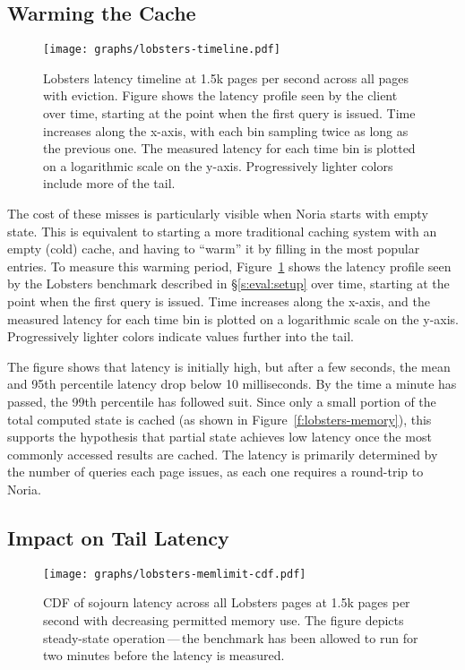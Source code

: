 \subsection{Warming the Cache}

\begin{figure}[t]
  \centering
  \texttt{[image: graphs/lobsters-timeline.pdf]}
  \caption{Lobsters latency timeline at 1.5k pages per second across all pages
  with eviction. Figure shows the latency profile seen by the client over time,
  starting at the point when the first query is issued. Time increases along the
  x-axis, with each bin sampling twice as long as the previous one. The measured
  latency for each time bin is plotted on a logarithmic scale on the y-axis.
  Progressively lighter colors include more of the tail.}
  \label{f:lobsters-timeline}
\end{figure}

The cost of these misses is particularly visible when Noria starts with empty
state. This is equivalent to starting a more traditional caching system with an
empty (cold) cache, and having to ``warm'' it by filling in the most popular
entries. To measure this warming period, Figure~\ref{f:lobsters-timeline} shows
the latency profile seen by the Lobsters benchmark described in
\S\ref{s:eval:setup} over time, starting at the point when the first query is
issued. Time increases along the x-axis, and the measured latency for each time
bin is plotted on a logarithmic scale on the y-axis. Progressively lighter
colors indicate values further into the tail.

The figure shows that latency is initially high, but after a few seconds, the
mean and 95th percentile latency drop below 10 milliseconds. By the time a
minute has passed, the 99th percentile has followed suit. Since only a small
portion of the total computed state is cached (as shown in
Figure~\ref{f:lobsters-memory}), this supports the hypothesis that partial state
achieves low latency once the most commonly accessed results are cached.
The latency is primarily determined by the number of queries each page issues,
as each one requires a round-trip to Noria.

\subsection{Impact on Tail Latency}

\begin{figure}[h]
  \centering
  \texttt{[image: graphs/lobsters-memlimit-cdf.pdf]}
  \caption{CDF of sojourn latency across all Lobsters pages at 1.5k pages per
  second with decreasing permitted memory use. The figure depicts steady-state
  operation\,---\,the benchmark has been allowed to run for two minutes before
  the latency is measured.}
  \label{f:lobsters-mem-latency}
\end{figure}

